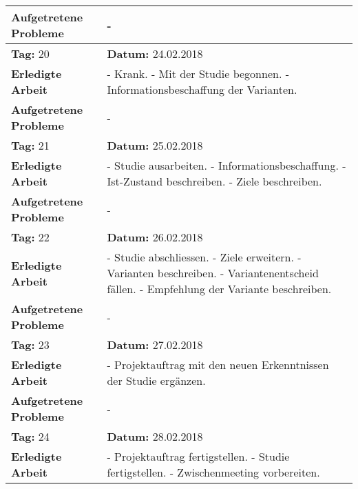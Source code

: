 \begin{longtable}{|p{5cm}|p{5cm}p{6cm}|}
\textbf{Aufgetretene Probleme} & \multicolumn{2}{p{11cm}|}{-} \\ \hline
\rowcolor{heading}\textbf{Tag:} 20 & \textbf{Datum:} 24.02.2018 & \\ \hline
\textbf{Erledigte Arbeit} & \multicolumn{2}{p{11cm}|}{- Krank. \newline
- Mit der Studie begonnen. \newline
- Informationsbeschaffung der Varianten.} \\ \hline
\textbf{Aufgetretene Probleme} & \multicolumn{2}{p{11cm}|}{-} \\ \hline
\rowcolor{heading}\textbf{Tag:} 21 & \textbf{Datum:} 25.02.2018 & \\ \hline
\textbf{Erledigte Arbeit} & \multicolumn{2}{p{11cm}|}{- Studie ausarbeiten. \newline
- Informationsbeschaffung. \newline
- Ist-Zustand beschreiben. \newline
- Ziele beschreiben.} \\ \hline
\textbf{Aufgetretene Probleme} & \multicolumn{2}{p{11cm}|}{-} \\ \hline
\rowcolor{heading}\textbf{Tag:} 22 & \textbf{Datum:} 26.02.2018 & \\ \hline
\textbf{Erledigte Arbeit} & \multicolumn{2}{p{11cm}|}{- Studie abschliessen. \newline
- Ziele erweitern. \newline
- Varianten beschreiben. \newline
- Variantenentscheid fällen. \newline
- Empfehlung der Variante beschreiben.} \\ \hline
\textbf{Aufgetretene Probleme} & \multicolumn{2}{p{11cm}|}{-} \\ \hline
\rowcolor{heading}\textbf{Tag:} 23 & \textbf{Datum:} 27.02.2018 & \\ \hline
\textbf{Erledigte Arbeit} & \multicolumn{2}{p{11cm}|}{- Projektauftrag mit den neuen Erkenntnissen der Studie ergänzen.} \\ \hline
\textbf{Aufgetretene Probleme} & \multicolumn{2}{p{11cm}|}{-} \\ \hline
\rowcolor{heading}\textbf{Tag:} 24 & \textbf{Datum:} 28.02.2018 & \\ \hline
\textbf{Erledigte Arbeit} & \multicolumn{2}{p{11cm}|}{- Projektauftrag fertigstellen. \newline
- Studie fertigstellen.
- Zwischenmeeting vorbereiten.} \\ \hline

\end{longtable}
